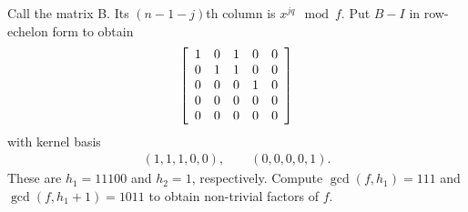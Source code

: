 \documentclass[10pt]{article}
\numberwithin{equation}{subsection}
\begin{document}
Call the matrix B.  Its $(n-1-j)$th column is $x^{jq} \mod f$.  Put $B-I$ in
row-echelon form to obtain
\begin{align*}
\left[\begin{array}{cccccccccccc} 
	1 & 0 & 1 & 0 & 0 \\
	0 & 1 & 1 & 0 & 0 \\
	0 & 0 & 0 & 1 & 0 \\
	0 & 0 & 0 & 0 & 0 \\
	0 & 0 & 0 & 0 & 0 \\
	 \end{array}\right]
\end{align*}
with kernel basis
\begin{align*}
	(1,1,1,0,0), \qquad (0,0,0,0,1).
\end{align*}
These are $h_1 = 11100$ and $h_2 = 1$, respectively.  Compute $\gcd(f, h_1) = 111$ and
$\gcd(f, h_1+1) = 1011$ to obtain non-trivial factors of $f$.
\end{document}
